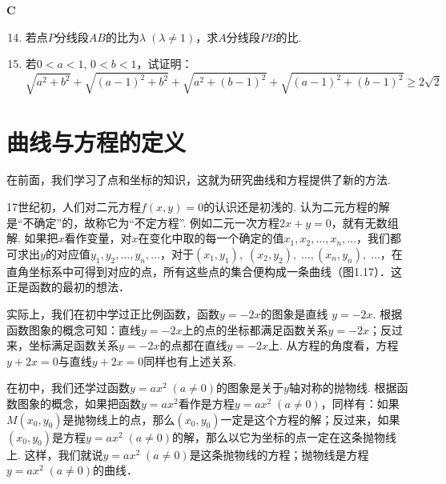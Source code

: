 \begin{center}
    \bfseries C
\end{center}

\begin{enumerate}\setcounter{enumi}{13}
    \item 若点$P$分线段$AB$的比为$\lambda\; (\lambda\ne 1)$，求$A$分线段$PB$的比.
    \item 若$0<a<1$, $0<b<1$，试证明：
\[\sqrt{a^2+b^2}+\sqrt{(a-1)^2+b^2}+\sqrt{a^2+(b-1)^2}+\sqrt{(a-1)^2+(b-1)^2}\ge 2\sqrt{2}\]
\end{enumerate}


\section{曲线与方程的定义}
在前面，我们学习了点和坐标的知识，这就为研究曲线和方程提供了新的方法.

\noindent
\begin{minipage}{0.55\textwidth}
    \CTEXindent
17世纪初，人们对二元方程$f(x,y)=0$的认识还是初浅的. 认为二元方程的解是“不确定”的，故称它为“不定方程”. 例如二元一次方程$2x+y=0$，就有无数组解. 如果把$x$看作变量，对$x$在变化中取的每一个确定的值$x_1,x_2,\ldots, x_n,\ldots$，我们都可求出$y$的对应值$y_1,y_2,\ldots,y_n,\ldots$，对于$(x_1,y_1),\; (x_2,y_2),\; \ldots,(x_n,y_n),\; \ldots$，在直角坐标系中可得到对应的点，所有这些点的集合便构成一条曲线（图1.17）．这正是函数的最初的想法．    
\end{minipage}\hfill
\begin{minipage}{0.4\textwidth}
\centering
{}
\end{minipage}




实际上，我们在初中学过正比例函数，函数$y=-2x$的图象是直线
$y=-2x$. 根据函数图象的概念可知：直线$y=-2x$上的点的坐标都满足函数关系$y=-2x$；反过来，坐标满足函数关系$y=-2x$的点都在直线$y=-2x$上. 从方程的角度看，方程$y+2x=0$与直线$y+2x=0$同样也有上述关系.

在初中，我们还学过函数$y=ax^2\; (a\ne 0)$的图象是关于$y$轴对称的抛物线. 根据函数图象的概念，如果把函数$y=ax^2$看作是方程$y=ax^2\; (a\ne 0)$，同样有：如果$M(x_0,y_0)$是抛物线上的点，那么$(x_0,y_0)$一定是这个方程的解；反过来，如果$(x_0,y_0)$是方程$y=ax^2\; (a\ne 0)$的解，那么以它为坐标的点一定在这条抛物线上. 这样，我们就说$y=ax^2\; (a\ne 0)$是这条抛物线的方程；抛物线是方程$y=ax^2\; (a\ne 0)$的曲线．

